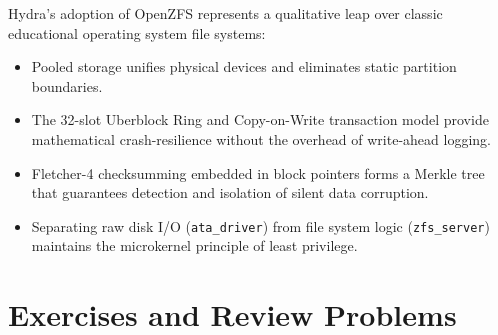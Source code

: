 Hydra’s adoption of OpenZFS represents a qualitative leap over classic educational operating system file systems:
\begin{itemize}
    \item Pooled storage unifies physical devices and eliminates static partition boundaries.
    \item The 32-slot Uberblock Ring and Copy-on-Write transaction model provide mathematical crash-resilience without the overhead of write-ahead logging.
    \item Fletcher-4 checksumming embedded in block pointers forms a Merkle tree that guarantees detection and isolation of silent data corruption.
    \item Separating raw disk I/O (\texttt{ata\_driver}) from file system logic (\texttt{zfs\_server}) maintains the microkernel principle of least privilege.
\end{itemize}

\section{Exercises and Review Problems}
\label{sec:exercises_chap4}

